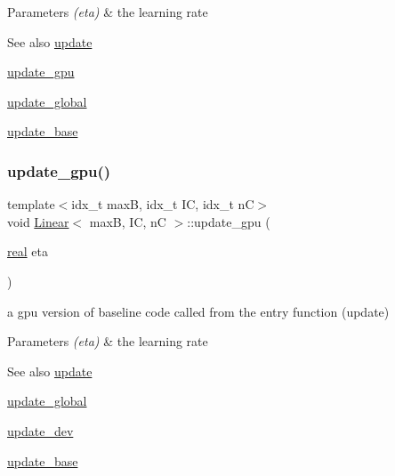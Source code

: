 \begin{DoxyParams}{Parameters}
{\em (eta)} & the learning rate \\
\hline
\end{DoxyParams}
\begin{DoxySeeAlso}{See also}
\hyperlink{structLinear_a828a72af0a1ccac904325ee280dbefa4}{update} 

\hyperlink{structLinear_a8ca71565731b9d8c3ba552578c61753a}{update\+\_\+gpu} 

\hyperlink{linear_8h_a810703be28422bb9483665cbdbafd968}{update\+\_\+global} 

\hyperlink{structLinear_aa59e1addd962ac7a70993229534ab899}{update\+\_\+base} 
\end{DoxySeeAlso}
\mbox{\label{structLinear_a8ca71565731b9d8c3ba552578c61753a}} 
\subsubsection{\texorpdfstring{update\+\_\+gpu()}{update\_gpu()}}
{\footnotesize\ttfamily template$<$idx\+\_\+t maxB, idx\+\_\+t IC, idx\+\_\+t nC$>$ \\
void \hyperlink{structLinear}{Linear}$<$ maxB, IC, nC $>$\+::update\+\_\+gpu (\begin{DoxyParamCaption}\item[{\hyperlink{vgg__util_8h_a1082d08aaa761215ec83e7149f27ad16}{real}}]{eta }\end{DoxyParamCaption})\hspace{0.3cm}{\ttfamily [inline]}}



a gpu version of baseline code called from the entry function (update) 


\begin{DoxyParams}{Parameters}
{\em (eta)} & the learning rate \\
\hline
\end{DoxyParams}
\begin{DoxySeeAlso}{See also}
\hyperlink{structLinear_a828a72af0a1ccac904325ee280dbefa4}{update} 

\hyperlink{linear_8h_a810703be28422bb9483665cbdbafd968}{update\+\_\+global} 

\hyperlink{structLinear_ad45413b0c13ca0ca89db6a3217a8b00b}{update\+\_\+dev} 

\hyperlink{structLinear_aa59e1addd962ac7a70993229534ab899}{update\+\_\+base} 
\end{DoxySeeAlso}


